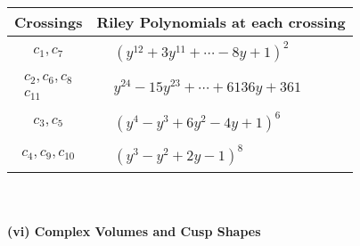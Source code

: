 \documentclass[1p]{elsarticle_modified}
\theoremstyle{definition}
\begin{document}
\begin{tabular}{m{50pt}|m{274pt}}
Crossings & \hspace{64pt}Riley Polynomials at each crossing \\
\hline $$\begin{aligned}c_{1},c_{7}\end{aligned}$$&$\begin{aligned}
&(y^{12}+3 y^{11}+\cdots-8 y+1)^{2}
\end{aligned}$\\
\hline $$\begin{aligned}c_{2},c_{6},c_{8}\\c_{11}\end{aligned}$$&$\begin{aligned}
&y^{24}-15 y^{23}+\cdots+6136 y+361
\end{aligned}$\\
\hline $$\begin{aligned}c_{3},c_{5}\end{aligned}$$&$\begin{aligned}
&(y^4- y^3+6 y^2-4 y+1)^6
\end{aligned}$\\
\hline $$\begin{aligned}c_{4},c_{9},c_{10}\end{aligned}$$&$\begin{aligned}
&(y^3- y^2+2 y-1)^8
\end{aligned}$\\
\hline
\end{tabular}\\~\\
\newpage\flushleft \textbf{(vi) Complex Volumes and Cusp Shapes}
\end{document}
